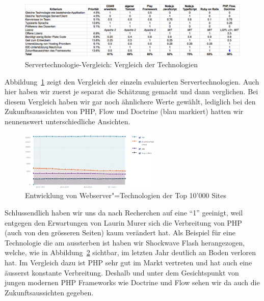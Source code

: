 			\begin{figure}[H]
				\begin{minipage}[b]{\linewidth}
					\includegraphics[width=\textwidth]{media/spreadsheets/ServertechnologieVergleichVergleichDerTechnologien.pdf}
					\centering
					\caption{Servertechnologie-Vergleich: Vergleich der Technologien}
					\label{fig:ServertechnologieVergleichVergleichDerTechnologien.pdf}
				\end{minipage}
			\end{figure}
			
			Abbildung~\ref{fig:ServertechnologieVergleichVergleichDerTechnologien.pdf} zeigt den Vergleich der einzeln evaluierten Servertechnologien.
			Auch hier haben wir zuerst je separat die Schätzung gemacht und dann verglichen.
			Bei diesem Vergleich haben wir gar noch ähnlichere Werte gewählt, lediglich bei den Zukunftsaussichten von PHP, Flow und Doctrine (blau markiert) hatten wir nennenswert unterschiedliche Ansichten.
			
			\begin{figure}
					\includegraphics[width=0.6\textwidth]{media/img/EntwicklungVonWebserverTechnologien.png}
					\centering
					\caption{Entwicklung von Webserver"=Technologien der Top 10'000 Sites \cite{sharesOfWebtechnologies}}
					\label{fig:EntwicklungVonWebserverTechnologien}
			\end{figure}
			
			Schlussendlich haben wir uns da nach Recherchen auf eine "`1"' geeinigt, weil entgegen den Erwartungen von Laurin Murer sich die Verbreitung von PHP (auch von den grösseren Seiten) kaum verändert hat.
			Als Beispiel für eine Technologie die am aussterben ist haben wir Shockwave Flash herangezogen, welche, wie in Abbildung~\ref{fig:EntwicklungVonWebserverTechnologien} sichtbar, im letzten Jahr deutlich an Boden verloren hat.
			Im Vergleich dazu ist PHP sehr gut im Markt vertreten und hat auch eine äusserst konstante Verbreitung.
			Deshalb und unter dem Gesichtspunkt von jungen modernen PHP Frameworks wie Doctrine und Flow sehen wir da auch die Zukunftsaussichten gegeben.
			
